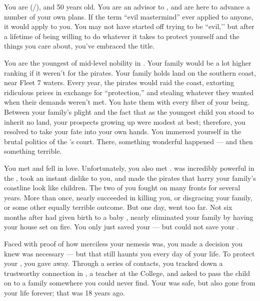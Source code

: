\documentclass[char]{GL2020}
\begin{document}
\name{\cEvil{}}

You are \cEvil{\full} (\cEvil{\they}/\cEvil{\them}), and 50 years old. You are an advisor to \cQueen{\full}, and are here to advance a number of your own plans. If the term ``evil mastermind'' ever applied to anyone, it would apply to you. You may not have started off trying to be ``evil,’’ but after a lifetime of being willing to do whatever it takes to protect yourself and the things you care about, you've embraced the title.

You are the youngest \cEvil{\offspring} of mid-level nobility in \pFarm{}. Your family would be a lot higher ranking if it weren't for the pirates. Your family holds land on the southern coast, near Fleet 7 waters. Every year, the pirates would raid the coast, extorting ridiculous prices in exchange for ``protection,'' and stealing whatever they wanted when their demands weren't met. You hate them with every fiber of your being. Between your family's plight and the fact that as the youngest child you stood to inherit no land, your prospects growing up were modest at best; therefore, you resolved to take your fate into your own hands. You immersed yourself in the brutal politics of the \cQueen{\Monarch}'s court. There, something wonderful happened — and then something terrible.

You met \cPirateChildParent{} and fell in love. Unfortunately, you also met \cEvilNemesis{\full}. \cEvilNemesis{} was incredibly powerful in the \pFarm{}, took an instant dislike to you, and made the pirates that harry your family's coastline look like children. The two of you fought on many fronts for several years. More than once, \cEvilNemesis{\they} nearly succeeded in killing you, or disgracing your family, or some other equally terrible outcome. But one day, \cEvilNemesis{\they} went too far. Not six months after \cPirateChildParent{} had given birth to a baby \cPirateChild{\child}, \cEvilNemesis{} nearly eliminated your family by having your house set on fire. You only just saved your \cPirateChild{\offspring} — but could not save your \cPirateChildParent{\spouse}.

Faced with proof of how merciless your nemesis was, you made a decision you knew was necessary — but that still haunts you every day of your life. To protect your \cPirateChild{\offspring}, you gave \cPirateChild{\them} away. Through a series of contacts, you tracked down a trustworthy connection in \cEthics{\full}, a teacher at the College, and asked \cEthics{\them} to pass the child on to a family somewhere you could never find. Your \cPirateChild{\offspring} was safe, but \cPirateChild{\they} \cPirateChild{\were} also gone from your life forever; that was 18 years ago.
\end{document}
